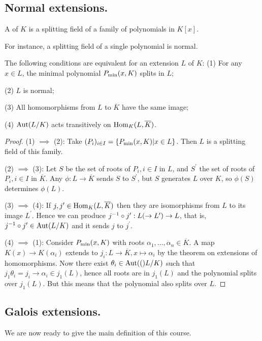 \subsection{Normal extensions.}

\begin{dfn}
A  of $K$ is a splitting field of a family of polynomials in $K[x]$.
\end{dfn}

For instance, a splitting field of a single polynomial is normal.

\begin{thm}
The following conditions are equivalent for an extension $L$ of $K$:
(1) For any $x \in L$, the minimal polynomial $P_{\mathrm{min}}(x, K)$ splits in $L$;

(2) $L$ is normal;

(3) All homomorphisms from $L$ to $\overline{K}$ have the same image;

(4) $\mathrm{Aut}(L/K)$ acts transitively on $\mathrm{Hom}_{K}({L, \overline{K}})$.
\end{thm}
\begin{proof}
(1) $\implies$ (2):  Take $(P_i)_{i \in I} = \left\{P_{\mathrm{min}}(x, K) | x \in L\right\}$. 
Then $L$ is a splitting field of this family.

(2) $\implies$ (3): Let $S$ be the set of roots of $P_i, i \in I$ in $L$, and $S^\prime$ the set of roots of $P_i, i \in I$ in $\overline{K}$.
Any $\phi: L \to \overline{K}$ sends $S$ to $S^\prime$, but $S$ generates $L$ over $K$, so $\phi(S)$ determines $\phi(L)$.

(3) $\implies$ (4): If $j, j^\prime \in \mathrm{Hom}_{K}({L, \overline{K}})$ then they are isomorphisms from $L$ to its image $L^\prime$. 
Hence we can produce $j^{-1} \circ j^\prime: L (\to L^\prime) \to L$, that is, $j^{-1} \circ j^\prime \in \mathrm{Aut}(L/K)$ and it sends $j$ to $j^\prime$.

(4) $\implies$ (1): Consider $P_{\mathrm{min}}(x, K)$ with roots $\alpha_1, \dotsc, \alpha_n \in \overline{K}$.
A map $K(x) \to K(\alpha_i)$ extends to $j_i: L \to \overline{K}, x \mapsto \alpha_i$ by the theorem on extensions of homomorphisms.
Now there exist $\theta_i \in \mathrm{Aut}(()L / K)$ such that $j_1 \theta_i = j_i \to \alpha_i \in j_1(L)$, hence all roots are in $j_1(L)$ and the polynomial splits over $j_1(L)$.
But this means that the polynomial also splits over $L$.
\end{proof}

\subsection{Galois extensions.}
We are now ready to give the main definition of this course.

